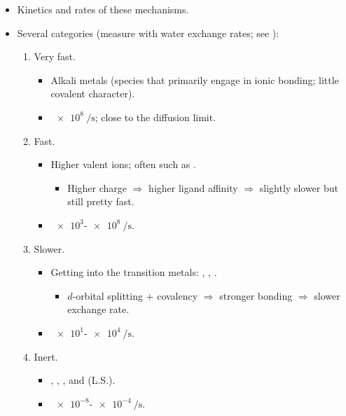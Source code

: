 \documentclass[../notes.tex]{subfiles}
\begin{document}
\begin{itemize}
\begin{enumerate}[resume]
    \end{enumerate}
    \item Kinetics and rates of these mechanisms.
    \item Several categories (measure with water exchange rates; see \textcite{bib:CHEM20100Notes}):
    \begin{enumerate}[label={\Roman*)}]
        \item Very fast.
        \begin{itemize}
            \item Alkali metals (species that primarily engage in ionic bonding; little covalent character).
            \item $\SI{e8}{\per\second}$; close to the diffusion limit.
        \end{itemize}
        \item Fast.
        \begin{itemize}
            \item Higher valent ions; often  such as .
            \begin{itemize}
                \item Higher charge $\Rightarrow$ higher ligand affinity $\Rightarrow$ slightly slower but still pretty fast.
            \end{itemize}
            \item $\num{e3}$-$\SI{e8}{\per\second}$.
        \end{itemize}
        \item Slower.
        \begin{itemize}
            \item Getting into the transition metals: , , .
            \begin{itemize}
                \item $d$-orbital splitting $+$ covalency $\Rightarrow$ stronger bonding $\Rightarrow$ slower exchange rate.
            \end{itemize}
            \item $\num{e1}$-$\SI{e4}{\per\second}$.
        \end{itemize}
        \item Inert.
        \begin{itemize}
            \item {}, , , and (L.S.).
            \item $\num{e-8}$-$\SI{e-4}{\per\second}$.
        \end{itemize}

\end{enumerate}
\end{itemize}
\end{document}

